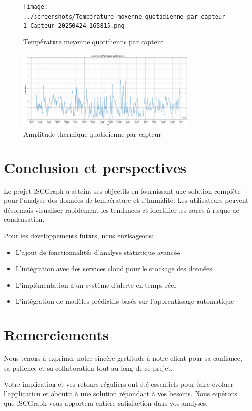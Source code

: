 \documentclass[a4paper,11pt]{article}
\begin{document}
\newpage

\begin{figure}[h]
    \centering
    \texttt{[image: ../screenshots/Température\_moyenne\_quotidienne\_par\_capteur\_1-Capteur---20250424\_165815.png]}
    \caption{Température moyenne quotidienne par capteur}
\end{figure}

\begin{figure}[h]
    \centering
    \includegraphics[width=0.8\textwidth]{../screenshots/Amplitude_thermique_quotidienne_1-Capteur---20250427_112247.png}
    \caption{Amplitude thermique quotidienne par capteur}
\end{figure}

\section{Conclusion et perspectives}

Le projet ISCGraph  a atteint ses objectifs en fournissant une solution complète pour l'analyse des données de température et d'humidité. Les utilisateurs peuvent désormais visualiser rapidement les tendances et identifier les zones à risque de condensation.

Pour les développements futurs, nous envisageons:
\begin{itemize}
    \item L'ajout de fonctionnalités d'analyse statistique avancée
    \item L'intégration avec des services cloud pour le stockage des données
    \item L'implémentation d'un système d'alerte en temps réel
    \item L'intégration de modèles prédictifs basés sur l'apprentissage automatique
\end{itemize}



\section*{Remerciements}

Nous tenons à exprimer notre sincère gratitude à notre client pour sa confiance, sa patience et sa collaboration tout au long de ce projet.  

Votre implication et vos retours réguliers ont été essentiels pour faire évoluer l’application et aboutir à une solution répondant à vos besoins. Nous espérons que ISCGraph  vous apportera entière satisfaction dans vos analyses.
\end{document}
